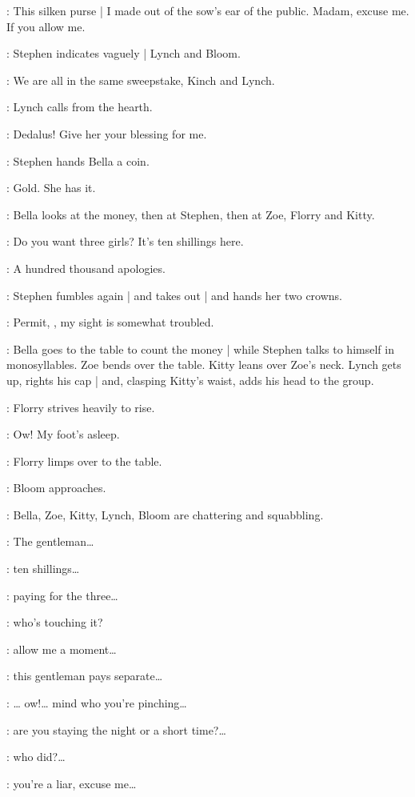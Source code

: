 \Stephen:
This silken purse |
I made out of the sow's ear of the public.
Madam,
excuse me.
If you allow me.

:
Stephen indicates vaguely |
Lynch and Bloom.

\Stephen:
We are all in the same sweepstake,
Kinch and Lynch.

:
Lynch calls from the hearth.

\Lynch:
Dedalus!
Give her your blessing for me.

:
Stephen hands Bella a coin.

\Stephen:
Gold.
She has it.

:
Bella looks at the money,
then at Stephen,
then at Zoe,
Florry and Kitty.

\Bella:
Do you want three girls?
It's ten shillings here.

\Stephen:
A hundred thousand apologies.

:
Stephen fumbles again |
and takes out |
and hands her two crowns.

\Stephen:
Permit,
,
my sight is somewhat troubled.

:
Bella goes to the table to count the money |
while Stephen talks to himself in monosyllables.
Zoe bends over the table.
Kitty leans over Zoe's neck.
%
Lynch gets up,
rights his cap |
and,
clasping Kitty's waist,
adds his head to the group.

:
Florry strives heavily to rise.

\Florry:
Ow!
My foot's asleep.

:
Florry limps over to the table.

:
Bloom approaches.

:
Bella,
Zoe,
Kitty,
Lynch,
Bloom are chattering and squabbling.

\Zoe:
The gentleman…

\Bella:
ten shillings…

\Lynch:
paying for the three…

\Kitty:
who's touching it?

\Bloom:
allow me a moment…

\Zoe:
this gentleman pays separate…

\Kitty:
… ow!…
mind who you're pinching…

\Bella:
are you staying the night or a short time?…

\Lynch:
who did?…

\Kitty:
you're a liar,
excuse me…

